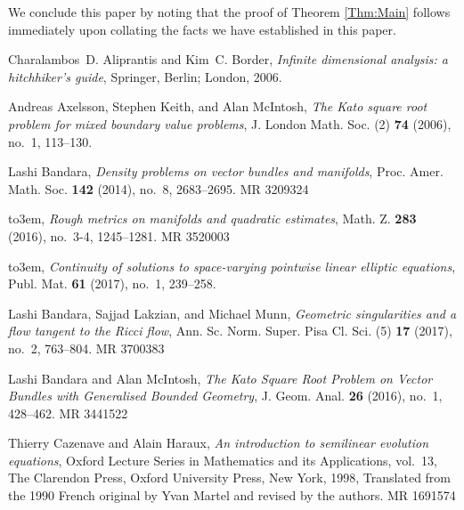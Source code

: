 \documentclass[a4paper, 12pt]{amsart}
\numberwithin{equation}{section}
\renewcommand{\~}{\tilde}
\renewcommand{\-}{\bar}
\newcommand{\8}{\infty}
\begin{document}
We conclude this paper by noting that the proof of Theorem \ref{Thm:Main}
follows immediately upon collating the facts we have established
in this paper.


\providecommand{\bysame}{\leavevmode\hbox to3em{\hrulefill}\thinspace}
\providecommand{\MR}{\relax\ifhmode\unskip\space\fi MR }
\providecommand{\MRhref}[2]{%
  \href{http://www.ams.org/mathscinet-getitem?mr=#1}{#2}
}
\providecommand{\href}[2]{#2}
\begin{thebibliography}{AKM06}

Charalambos~D. Aliprantis and Kim~C. Border, \emph{Infinite dimensional
  analysis: a hitchhiker's guide}, Springer, Berlin; London, 2006.

Andreas Axelsson, Stephen Keith, and Alan McIntosh, \emph{The {K}ato square
  root problem for mixed boundary value problems}, J. London Math. Soc. (2)
  \textbf{74} (2006), no.~1, 113--130.

Lashi Bandara, \emph{Density problems on vector bundles and manifolds}, Proc.
  Amer. Math. Soc. \textbf{142} (2014), no.~8, 2683--2695. \MR{3209324}

\bysame, \emph{Rough metrics on manifolds and quadratic estimates}, Math. Z.
  \textbf{283} (2016), no.~3-4, 1245--1281. \MR{3520003}

\bysame, \emph{Continuity of solutions to space-varying pointwise linear
  elliptic equations}, Publ. Mat. \textbf{61} (2017), no.~1, 239--258.

Lashi Bandara, Sajjad Lakzian, and Michael Munn, \emph{Geometric singularities
  and a flow tangent to the {R}icci flow}, Ann. Sc. Norm. Super. Pisa Cl. Sci.
  (5) \textbf{17} (2017), no.~2, 763--804. \MR{3700383}

Lashi Bandara and Alan McIntosh, \emph{The {K}ato {S}quare {R}oot {P}roblem on
  {V}ector {B}undles with {G}eneralised {B}ounded {G}eometry}, J. Geom. Anal.
  \textbf{26} (2016), no.~1, 428--462. \MR{3441522}

Thierry Cazenave and Alain Haraux, \emph{An introduction to semilinear
  evolution equations}, Oxford Lecture Series in Mathematics and its
  Applications, vol.~13, The Clarendon Press, Oxford University Press, New
  York, 1998, Translated from the 1990 French original by Yvan Martel and
  revised by the authors. \MR{1691574}


\end{thebibliography}
\end{document}
